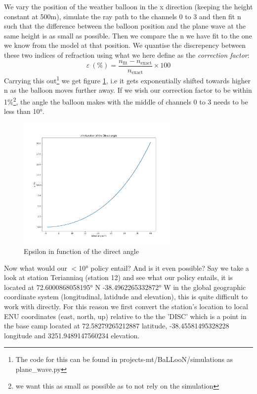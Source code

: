 \documentclass[11pt,a4paper,faculty=we,language=en,doctype=report]{cls/ugent-doc}
\begin{document}
We vary the position of the weather balloon in the x direction (keeping the
height constant at 500m), simulate the ray path to the channels 0 to 3 and then fit n
such that the difference between the balloon position and the plane wave at the same
height is as small as possible.  Then we compare the n we have fit to the
one we know from the model at that position.  We quantise the discrepency
between these two indices of refraction using what we here define as the
\textit{correction factor}:
\begin{equation}
  \varepsilon\ (\%) = \frac{n_\text{fit} - n_{\text{exact}}}{n_{\text{exact}}} \times 100
\end{equation}
Carrying this out\footnote{The code for this can be found in
projects-mt/BaLLooN/simulations as plane\_wave.py} we get figure
\ref{fig:EpsilonIFODirect}, i.e it gets exponentially shifted towards higher n
as the balloon moves further away. If we wish our correction factor to be
within 1\%\footnote{we want this as small as possible as to not rely on the
simulation}, the angle the balloon makes with the middle of channels 0 to 3
needs to be less than 10°.
\begin{figure}
	\centering
	\includegraphics[width=0.7\textwidth]{EpsilonIFODirect.pdf}
	\caption{Epsilon in function of the direct angle}
	\label{fig:EpsilonIFODirect}
\end{figure}

Now what would our $<$10° policy entail? And is it even possible?  Say we take
a look at station Terianniaq (station 12) and see what our policy entails,
it is located at 72.6000868058195° N -38.4962265332872° W in the global geographic
coordinate system (longitudinal, latidude and elevation), this is quite
difficult to work with directly. For this reason we first convert the station's location to 
local ENU coordinates (east, north, up) relative to the the 'DISC' which is a point in the base camp located at
72.58279265212887 latitude, -38.45581495328228 longitude and 3251.9489147560234 elevation.  
\end{document}

